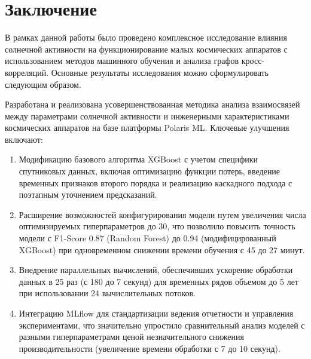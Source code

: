 \titleformat{\section}[block]{\large\bfseries\filcenter}{}{0em}{}
\chapter*{Заключение}

В рамках данной работы было проведено комплексное исследование влияния солнечной
активности на функционирование малых космических аппаратов с использованием
методов машинного обучения и анализа графов кросс-корреляций. Основные
результаты исследования можно сформулировать следующим образом.

\vspace{0.5cm}

Разработана и реализована усовершенствованная методика анализа взаимосвязей
между параметрами солнечной активности и инженерными характеристиками
космических аппаратов на базе платформы Polaris ML. Ключевые улучшения включают:

\begin{enumerate}
	\item Модификацию базового алгоритма XGBoost с учетом специфики спутниковых данных, включая оптимизацию функции потерь, введение временных признаков второго порядка и реализацию каскадного подхода с поэтапным уточнением предсказаний.

	\item Расширение возможностей конфигурирования модели путем увеличения числа оптимизируемых гиперпараметров до 30, что позволило повысить точность модели с F1-Score 0.87 (Random Forest) до 0.94 (модифицированный XGBoost) при одновременном снижении времени обучения с 45 до 27 минут.

	\item Внедрение параллельных вычислений, обеспечивших ускорение обработки данных в 25 раз (с 180 до 7 секунд) для временных рядов объемом до 5 лет при использовании 24 вычислительных потоков.

	\item Интеграцию MLflow для стандартизации ведения отчетности и управления экспериментами, что значительно упростило сравнительный анализ моделей с разными гиперпараметрами ценой незначительного снижения производительности (увеличение времени обработки с 7 до 10 секунд).
\end{enumerate}

\vspace{0.5cm}

